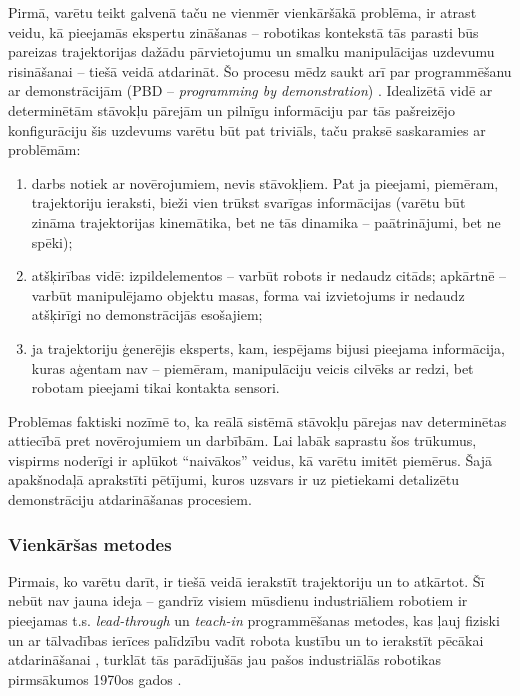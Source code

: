 \documentclass[12pt, a4paper]{article}
\numberwithin{equation}{section} %
\begin{document}
Pirmā, varētu teikt galvenā taču ne vienmēr vienkāršākā problēma, ir atrast veidu, kā pieejamās ekspertu zināšanas -- robotikas kontekstā tās parasti būs pareizas trajektorijas dažādu pārvietojumu un smalku manipulācijas uzdevumu risināšanai -- tiešā veidā atdarināt. Šo procesu mēdz saukt arī par programmēšanu ar demonstrācijām (PBD -- \textit{programming by demonstration}) \cite{muench1994robot,billard2008handbook}. Idealizētā vidē ar determinētām stāvokļu pārejām un pilnīgu informāciju par tās pašreizējo konfigurāciju šis uzdevums varētu būt pat triviāls, taču praksē saskaramies ar problēmām:

\begin{enumerate}
    \item darbs notiek ar novērojumiem, nevis stāvokļiem. Pat ja pieejami, piemēram, trajektoriju ieraksti, bieži vien trūkst svarīgas informācijas (varētu būt zināma trajektorijas kinemātika, bet ne tās dinamika -- paātrinājumi, bet ne spēki);
    \item atšķirības vidē: izpildelementos -- varbūt robots ir nedaudz citāds; apkārtnē -- varbūt manipulējamo objektu masas, forma vai izvietojums ir nedaudz atšķirīgi no demonstrācijās esošajiem;
    \item ja trajektoriju ģenerējis eksperts, kam, iespējams bijusi pieejama informācija, kuras aģentam nav -- piemēram, manipulāciju veicis cilvēks ar redzi, bet robotam pieejami tikai kontakta sensori.
\end{enumerate}

Problēmas faktiski nozīmē to, ka reālā sistēmā stāvokļu pārejas nav determinētas attiecībā pret novērojumiem un darbībām. Lai labāk saprastu šos trūkumus, vispirms noderīgi ir aplūkot ``naivākos'' veidus, kā varētu imitēt piemērus. Šajā apakšnodaļā aprakstīti pētījumi, kuros uzsvars ir uz pietiekami detalizētu demonstrāciju atdarināšanas procesiem.

\subsubsection{Vienkāršas metodes}

Pirmais, ko varētu darīt, ir tiešā veidā ierakstīt trajektoriju un to atkārtot. Šī nebūt nav jauna ideja -- gandrīz visiem mūsdienu industriāliem robotiem ir pieejamas t.s. \textit{lead-through} un \textit{teach-in} programmēšanas metodes, kas ļauj fiziski un ar tālvadības ierīces palīdzību vadīt robota kustību un to ierakstīt pēcākai atdarināšanai \cite{teach_pendant}, turklāt tās parādījušās jau pašos industriālās robotikas pirmsākumos 1970os gados \cite{abb2016special}.
\end{document}
